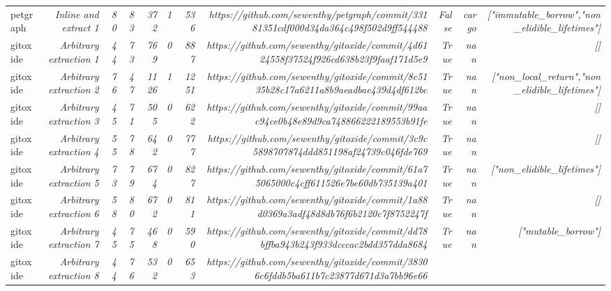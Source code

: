 \begin{table}[]
{\begin{tabular}{lrrrrrrrrrr}
petgraph & \textit{Inline and extract 1} & \textit{80} & \textit{83} & \textit{372} & \textit{1} & \textit{536} & \textit{https://github.com/sewenthy/petgraph/commit/33181351cdf000d34da364c498f502d9ff544488
} & \textit{False} & \textit{cargo} & \textit{["immutable_borrow","non_elidible_lifetimes"]} \\
gitoxide & \textit{Arbitrary extraction 1} & \textit{44} & \textit{73} & \textit{769} & \textit{0} & \textit{887} & \textit{https://github.com/sewenthy/gitoxide/commit/4d6124558f37524f926cd638b23f9faaf171d5e9
} & \textit{True} & \textit{nan} & \textit{[]} \\
gitoxide & \textit{Arbitrary extraction 2} & \textit{76} & \textit{47} & \textit{1126} & \textit{1} & \textit{1251} & \textit{https://github.com/sewenthy/gitoxide/commit/8c5135b28c17a6211a8b9aeadbae439d4df612bc
} & \textit{True} & \textit{nan} & \textit{["non_local_return","non_elidible_lifetimes"]} \\
gitoxide & \textit{Arbitrary extraction 3} & \textit{45} & \textit{71} & \textit{505} & \textit{0} & \textit{622} & \textit{https://github.com/sewenthy/gitoxide/commit/99aac94ce0b48e89d9ca748866222189553b91fe
} & \textit{True} & \textit{nan} & \textit{[]} \\
gitoxide & \textit{Arbitrary extraction 4} & \textit{55} & \textit{78} & \textit{642} & \textit{0} & \textit{777} & \textit{https://github.com/sewenthy/gitoxide/commit/3c9c5898707874ddd851198af24739c046fde769
} & \textit{True} & \textit{nan} & \textit{[]} \\
gitoxide & \textit{Arbitrary extraction 5} & \textit{73} & \textit{79} & \textit{674} & \textit{0} & \textit{827} & \textit{https://github.com/sewenthy/gitoxide/commit/61a75065000c4cff611526e7be60db735139a401
} & \textit{True} & \textit{nan} & \textit{["non_elidible_lifetimes"]} \\
gitoxide & \textit{Arbitrary extraction 6} & \textit{58} & \textit{80} & \textit{672} & \textit{0} & \textit{811} & \textit{https://github.com/sewenthy/gitoxide/commit/1a88d0369a3adf48d8db76f6b2120c7f8752247f
} & \textit{True} & \textit{nan} & \textit{[]} \\
gitoxide & \textit{Arbitrary extraction 7} & \textit{45} & \textit{75} & \textit{468} & \textit{0} & \textit{590} & \textit{https://github.com/sewenthy/gitoxide/commit/dd78bffba943b243f933dcccac2bdd357dda8684
} & \textit{True} & \textit{nan} & \textit{["mutable_borrow"]} \\
gitoxide & \textit{Arbitrary extraction 8} & \textit{44} & \textit{76} & \textit{532} & \textit{0} & \textit{653} & \textit{https://github.com/sewenthy/gitoxide/commit/38306c6fddb5ba611b7c23877d671d3a7bb96e66
}
\end{tabular}}
\end{table}
